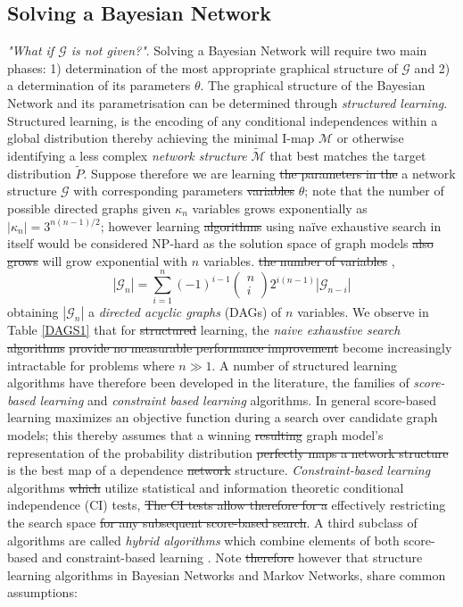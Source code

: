 \documentclass[7pt]{article}
\begin{document}
\subsection{Solving a Bayesian Network}
\emph{"What if $\mathcal{G}$ is not given?"}. Solving a Bayesian Network will require two main phases: 1) determination of the most appropriate graphical structure of $\mathcal{G}$ and 2) a determination of its parameters $\theta$. The graphical structure of the Bayesian Network and its parametrisation can be determined through \emph{structured learning}. Structured learning, is the encoding of any conditional independences within a global distribution thereby achieving the minimal I-map $\mathcal{M}$ or otherwise identifying a less complex \emph{network structure} $\tilde{\mathcal{M}}$ that best matches the target distribution ${\tilde{P}}$. Suppose therefore we are learning \st{the parameters in the} a network structure $\mathcal{G}$  with corresponding {parameters} \st{variables} $\theta$; note that the number of possible directed graphs given $\kappa_n$ variables grows exponentially as $|\kappa_n| = 3^{{n(n-1)}/{2}}$;
however learning \st{algorithms} using naïve exhaustive search in itself would be considered NP-hard {as}  the solution space of graph models \st{also grows} will grow exponential with $n$ variables.  \st{the number of variables} \cite{robinson1973counting},
\begin{equation}
|\mathcal{G}_n| = \sum_{i=1}^n (-1)^{i-1}  \begin{pmatrix}
n\\ 
i 
\end{pmatrix}
2^{i(n-1)} |\mathcal{G}_{n-i}|
\end{equation}
obtaining $|\mathcal{G}_n|$ a \emph{directed acyclic graphs} (DAGs) of $n$ variables. We observe  in Table \ref{DAGS1} that for \st{structured} learning, the \emph{naive exhaustive search} \st{algorithms} \st{provide no measurable performance improvement} become increasingly intractable for problems where $n\gg1$.   A number of structured learning algorithms have therefore been developed in the literature,  the families of \emph{score-based learning} and \emph{constraint based learning} algorithms. In general score-based learning maximizes an objective function during a search over candidate graph models; this  thereby assumes that a winning \st{resulting} graph model's representation of the probability distribution \st{perfectly maps a network structure} is the best map of a dependence \st{network} structure.  \emph{Constraint-based learning} algorithms \st{which} utilize statistical and information theoretic conditional independence (CI) tests, \st{The CI tests allow therefore for a} effectively restricting  {the} search space \st{for any subsequent score-based search}. A third subclass of algorithms are called \emph{hybrid algorithms} which combine elements of both score-based and constraint-based learning \cite{scutari2019learns, scanagatta2019survey}. Note \st{therefore} however that structure learning algorithms in Bayesian Networks and Markov Networks, share common assumptions:
\end{document}
